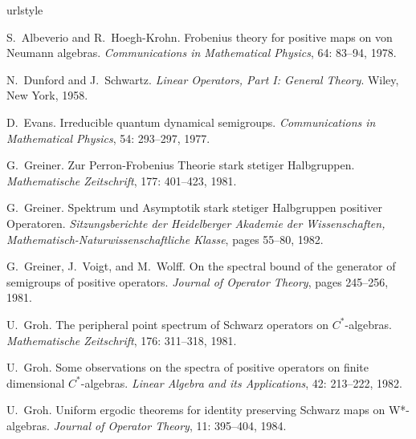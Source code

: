 \begin{thebibliography}{15}
\providecommand{\natexlab}[1]{#1}
\providecommand{\url}[1]{\texttt{#1}}
\expandafter\ifx\csname urlstyle\endcsname\relax
  \providecommand{\doi}[1]{doi: #1}\else
  \providecommand{\doi}{doi: \begingroup \urlstyle{rm}\Url}\fi

S.~Albeverio and R.~Hoegh-Krohn.
\newblock Frobenius theory for positive maps on von {N}eumann algebras.
\newblock \emph{Communications in Mathematical Physics}, 64: 83--94,
  1978.

N.~Dunford and J.~Schwartz.
\newblock \emph{Linear Operators, {P}art {I}: {G}eneral {T}heory}.
\newblock Wiley, New York, 1958.

D.~Evans.
\newblock Irreducible quantum dynamical semigroups.
\newblock \emph{Communications in Mathematical Physics}, 54: 293--297,
  1977.

G.~Greiner.
\newblock Zur {P}erron-{F}robenius {T}heorie stark stetiger {H}albgruppen.
\newblock \emph{Mathematische Zeitschrift}, 177: 401--423, 1981.

G.~Greiner.
\newblock Spektrum und {A}symptotik stark stetiger {H}albgruppen positiver
  {O}peratoren.
\newblock \emph{Sitzungsberichte der Heidelberger Akademie der Wissenschaften,
  Mathematisch-Naturwissenschaftliche Klasse}, pages 55--80, 1982.

G.~Greiner, J.~Voigt, and M.~Wolff.
\newblock On the spectral bound of the generator of semigroups of positive
  operators.
\newblock \emph{Journal of Operator Theory}, pages 245--256, 1981.

U.~Groh.
\newblock The peripheral point spectrum of {S}chwarz operators on
  {$C^*$}-algebras.
\newblock \emph{Mathematische Zeitschrift}, 176: 311--318, 1981.

U.~Groh.
\newblock Some observations on the spectra of positive operators on finite
  dimensional {$C^*$}-algebras.
\newblock \emph{Linear Algebra and its Applications}, 42: 213--222,
  1982.

U.~Groh.
\newblock Uniform ergodic theorems for identity preserving {S}chwarz maps on
  {W*}-algebras.
\newblock \emph{Journal of Operator Theory}, 11: 395--404, 1984.


\end{thebibliography}
